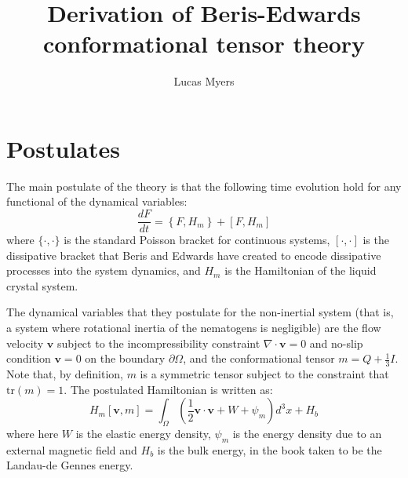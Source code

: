 \documentclass[reqno]{article}
\begin{document}
	\title{Derivation of Beris-Edwards conformational tensor theory}
	\author{Lucas Myers}
	\maketitle

  \section{Postulates}
  
  The main postulate of the theory is that the following time evolution hold for any
  functional of the dynamical variables:
  \begin{equation}
    \frac{d F}{dt} = \left\{ F, H_m \right\} + \left[ F, H_m \right]
  \end{equation}
  where $\{\cdot, \cdot\}$ is the standard Poisson bracket for continuous
  systems, $[\cdot, \cdot]$ is the dissipative bracket that Beris and
  Edwards have created to encode dissipative processes into the system dynamics,
  and $H_m$ is the Hamiltonian of the liquid crystal system.

  The dynamical variables that they postulate for the non-inertial system (that
  is, a system where rotational inertia of the nematogens is negligible) are the
  flow velocity $\mathbf{v}$ subject to the incompressibility constraint $\nabla
  \cdot \mathbf{v} = 0$ and no-slip condition $\mathbf{v} = 0$ on the boundary
  $\partial \Omega$, and the conformational tensor $m = Q + \frac13 I$.
  Note that, by definition, $m$ is a symmetric tensor subject to the constraint
  that $\text{tr}(m) = 1$.
  The postulated Hamiltonian is written as:
  \begin{equation}
    H_m[\mathbf{v}, m]
    =
    \int_\Omega \left(
      \frac12 \mathbf{v} \cdot \mathbf{v}
      + W
      + \psi_m
    \right) d^3 x
    + H_b
  \end{equation}
  where here $W$ is the elastic energy density, $\psi_m$ is the energy density
  due to an external magnetic field and $H_b$ is the bulk energy, in the book
  taken to be the Landau-de Gennes energy.
\end{document}
